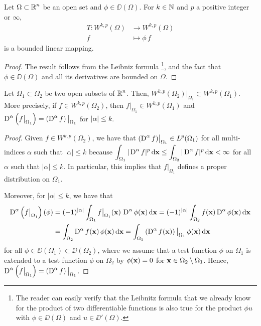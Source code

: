 \begin{prop} \label{sob_T_dd_wkp}
Let $\displaystyle \Omega \subset \mathbb{R}^n$ be an open set and
$\phi \in \DD(\Omega)$.
For $k\in \mathbb{N}$ and $p$ a positive integer or $\infty$,
\begin{align*}
T: W^{k,p}(\Omega) &\rightarrow W^{k,p}(\Omega) \\
f &\mapsto \phi \,f 
\end{align*}
is a bounded linear mapping.
\end{prop}

\begin{proof}
The result follows from the Leibniz formula \footnote{The reader can
easily verify that the Leibnitz formula that we already know for the
product of two differentiable functions
is also true for the product $\phi u$ with $\phi \in \DD(\Omega)$ and
$u \in \DD'(\Omega)$.}, and the fact that $\phi\in \DD(\Omega)$ and
all its derivatives are bounded on $\Omega$.
\end{proof}

\begin{lemma} \label{sobVsubsetU}
Let $\Omega_1 \subset \Omega_2$ be two open subsets of
$\displaystyle \mathbb{R}^n$.  Then,
$\displaystyle W^{k,p}(\Omega_2)\big|_{\Omega_1} \subset W^{k,p}(\Omega_1)$.  More
precisely, if $\displaystyle f \in W^{k,p}(\Omega_2)$, then
$\displaystyle f\big|_{\Omega_1} \in W^{k,p}(\Omega_1)$ and
$\displaystyle \operatorname{D}^\alpha \left(f\big|_{\Omega_1}\right) =
\left( \operatorname{D}^\alpha f \right)\big|_{\Omega_1}$ for $|\alpha| \leq k$.
\end{lemma}

\begin{proof}
Given $\displaystyle f \in W^{k,p}(\Omega_2)$, we have that
$\displaystyle (\operatorname{D}^\alpha f)\big|_{\Omega_1} \in L^p(\Omega_1)$ for
all multi-indices $\alpha$ such that $|\alpha|\leq k$ because
$\displaystyle \int_{\Omega_1} |\operatorname{D}^\alpha f|^p \,\mathrm{d}{\mathbf{x}} \leq 
\int_{\Omega_2} |\operatorname{D}^\alpha f|^p \,\mathrm{d}{\mathbf{x}} < \infty$
for all $\alpha$ such that $|\alpha|\leq k$.  In
particular, this implies that 
$\displaystyle f\big|_{\Omega_1}$ defines a proper distribution on $\Omega_1$.

Moreover, for $|\alpha| \leq k$, we have that
\begin{align*}
\operatorname{D}^\alpha \left(f\big|_{\Omega_1}\right)(\phi)
&= (-1)^{|\alpha|} \int_{\Omega_1} f\big|_{\Omega_1}(\mathbf{x})
\,\operatorname{D}^{\alpha}\phi(\mathbf{x}) \,\mathrm{d}{\mathbf{x}}
= (-1)^{|\alpha|} \int_{\Omega_2} f(\mathbf{x}) \operatorname{D}^{\alpha}\phi(\mathbf{x})
\,\mathrm{d}{\mathbf{x}} \\
&= \int_{\Omega_2} \operatorname{D}^\alpha f(\mathbf{x}) \, \phi(\mathbf{x}) \,\mathrm{d}{\mathbf{x}}
= \int_{\Omega_1} \left(\operatorname{D}^\alpha f(\mathbf{x})\right)\big|_{\Omega_1} \,
\phi(\mathbf{x}) \,\mathrm{d}{\mathbf{x}}
\end{align*}
for all $\phi \in \DD(\Omega_1) \subset \DD(\Omega_2)$, where we
assume that a test function $\phi$ on $\Omega_1$ is extended to a test
function $\phi$ on $\Omega_2$ by
$\phi(\mathbf{x}) = 0$ for $\mathbf{x} \in \Omega_2 \setminus \Omega_1$.  Hence,
$\displaystyle \operatorname{D}^\alpha \left(f\big|_{\Omega_1}\right) =
\left( \operatorname{D}^\alpha f \right)\big|_{\Omega_1}$.
\end{proof}

